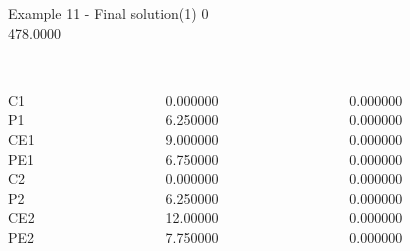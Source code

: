 \begin{frame}{Example 11 - Final solution(1)}
\footnotesize
{}  0\\
  478.0000\\

\begin{columns}[t]
\begin{column}{0.3\textwidth}
\\
C1\\
P1\\
CE1\\
PE1\\
C2\\
P2\\
CE2\\
PE2\\
\end{column}
\begin{column}{0.3\textwidth}
\\
0.000000\\
6.250000\\
9.000000\\
6.750000\\
0.000000\\
6.250000\\
12.00000\\
7.750000\\
\end{column}  

\begin{column}{0.3\textwidth}
\\
0.000000\\
0.000000\\
0.000000\\
0.000000\\
0.000000\\
0.000000\\
0.000000\\
0.000000\\
\end{column}
\end{columns}  
\end{frame}


